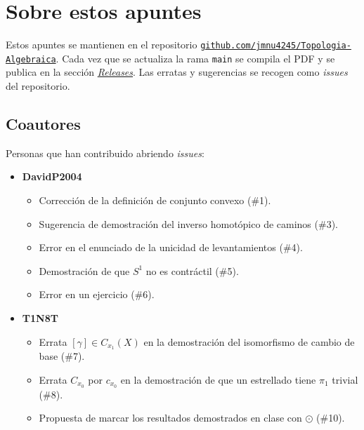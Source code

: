 \section*{Sobre estos apuntes}

Estos apuntes se mantienen en el repositorio
\href{https://github.com/jmnu4245/Topologia-Algebraica}{\texttt{github.com/jmnu4245/Topologia-Algebraica}}.
Cada vez que se actualiza la rama \texttt{main} se compila el PDF y se publica en la sección
\href{https://github.com/jmnu4245/Topologia-Algebraica/releases}{\emph{Releases}}. Las erratas y sugerencias se recogen como \emph{issues} del repositorio.

\subsection*{Coautores}
Personas que han contribuido abriendo \emph{issues}:
\begin{itemize}
    \item \textbf{DavidP2004}
    \begin{itemize}
        \item Corrección de la definición de conjunto convexo (\#1).
        \item Sugerencia de demostración del inverso homotópico de caminos (\#3).
        \item Error en el enunciado de la unicidad de levantamientos (\#4).
        \item Demostración de que $S^1$ no es contráctil (\#5).
        \item Error en un ejercicio (\#6).
    \end{itemize}
    \item \textbf{T1N8T}
    \begin{itemize}
        \item Errata $[\gamma] \in C_{x_1}(X)$ en la demostración del isomorfismo de cambio de base (\#7).
        \item Errata $C_{x_0}$ por $c_{x_0}$ en la demostración de que un estrellado tiene $\pi_1$ trivial (\#8).
        \item Propuesta de marcar los resultados demostrados en clase con $\odot$ (\#10).
    \end{itemize}
\end{itemize}

